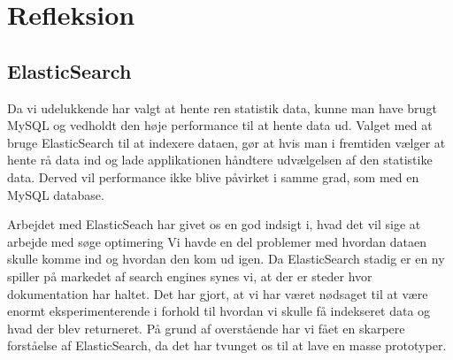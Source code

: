 \section{Refleksion}
\subsection{ElasticSearch}
Da vi udelukkende har valgt at hente ren statistik data, kunne man have brugt MySQL og vedholdt den høje performance til at hente data ud. 
Valget med at bruge ElasticSearch til at indexere dataen, gør at hvis man i fremtiden vælger at hente rå data ind og lade applikationen håndtere
udvælgelsen af den statistike data. Derved vil performance ikke blive påvirket i samme grad, som med en MySQL database.

Arbejdet med ElasticSeach har givet os en god indsigt i, hvad det vil sige at arbejde med søge optimering
Vi havde en del problemer med hvordan dataen skulle komme ind og hvordan den kom ud igen. 
Da ElasticSearch stadig er en ny spiller på markedet af search engines synes vi, at der er steder hvor dokumentation har haltet.
Det har gjort, at vi har været nødsaget til at være enormt eksperimenterende i forhold til hvordan vi skulle få indekseret data og hvad der blev returneret.
På grund af overstående har vi fået en skarpere forståelse af ElasticSearch, da det har tvunget os til at lave en masse prototyper.
